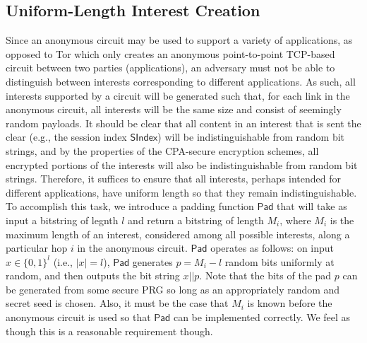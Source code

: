 \documentclass[10pt]{article}
\begin{document}
\subsection{Uniform-Length Interest Creation}
Since an anonymous circuit may be used to support a variety of applications, as opposed to Tor which only creates an anonymous point-to-point TCP-based circuit between two parties (applications), an adversary must not be able to distinguish between interests corresponding to different applications. As such, all interests supported by a circuit will be generated such that, for each link in the anonymous circuit, all interests will be the same size and consist of seemingly random payloads. It should be clear that all content in an interest that is sent the clear (e.g., the session index $\mathsf{SIndex}$) will be indistinguishable from random bit strings, and by the properties of the CPA-secure encryption schemes, all encrypted portions of the interests will also be indistinguishable from random bit strings. Therefore, it suffices to ensure that all interests, perhaps intended for different applications, have uniform length so that they remain indistinguishable. To accomplish this task, we introduce a padding function $\mathsf{Pad}$ that will take as input a bitstring of legnth $l$ and return a bitstring of length $M_i$, where $M_i$ is the maximum length of an interest, considered among all possible interests, along a particular hop $i$ in the anonymous circuit. $\mathsf{Pad}$ operates as follows: on input $x \in \{0,1\}^l$ (i.e., $|x| = l$), $\mathsf{Pad}$ generates $p = M_i - l$ random bits uniformly at random, and then outputs the bit string $x || p$. Note that the bits of the pad $p$ can be generated from some secure PRG so long as an appropriately random and secret seed is chosen. Also, it must be the case that $M_i$ is known before the anonymous circuit is used so that $\mathsf{Pad}$ can be implemented correctly. We feel as though this is a reasonable requirement though.

\end{document}
